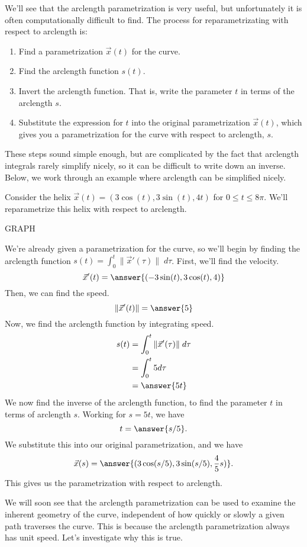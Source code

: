 \documentclass{ximera}
\begin{document}
We'll see that the arclength parametrization is very useful, but unfortunately it is often computationally difficult to find. The process for reparametrizating with respect to arclength is:
\begin{enumerate}
\item Find a parametrization $\vec{x}(t)$ for the curve.
\item Find the arclength function $s(t)$.
\item Invert the arclength function. That is, write the parameter $t$ in terms of the arclength $s$.
\item Substitute the expression for $t$ into the original parametrization $\vec{x}(t)$, which gives you a parametrization for the curve with respect to arclength, $s$.
\end{enumerate}

These steps sound simple enough, but are complicated by the fact that arclength integrals rarely simplify nicely, so it can be difficult to write down an inverse. Below, we work through an example where arclength can be simplified nicely.

\begin{example}
Consider the helix $\vec{x}(t) = (3\cos(t), 3\sin(t), 4t)$ for $0\leq t \leq 8\pi$. We'll reparametrize this helix with respect to arclength.

GRAPH

We're already given a parametrization for the curve, so we'll begin by finding the arclength function $s(t) = \int_0^t \|\vec{x}'(\tau)\|\;d\tau$. First, we'll find the velocity.
\[
\vec{x}'(t) = \answer{(-3\sin(t),3\cos(t), 4)} 
\]
Then, we can find the speed.
\[
\|\vec{x}'(t)\| = \answer{5}
\]
Now, we find the arclength function by integrating speed.
\begin{align*}
s(t) &= \int_0^t \|\vec{x}'(\tau)\|\;d\tau\\
&= \int_0^t 5d\tau\\
&= \answer{5t}
\end{align*}
We now find the inverse of the arclength function, to find the parameter $t$ in terms of arclength $s$. Working for $s=5t$, we have
\[
t = \answer{s/5}.
\]
We substitute this into our original parametrization, and we have
\[
\vec{x}(s) = \answer{(3\cos(s/5), 3\sin(s/5), \frac{4}{5}s)}.
\]
This gives us the parametrization with respect to arclength.
\end{example}

We will soon see that the arclength parametrization can be used to examine the inherent geometry of the curve, independent of how quickly or slowly a given path traverses the curve. This is because the arclength parametrization always has unit speed. Let's investigate why this is true.
\end{document}
